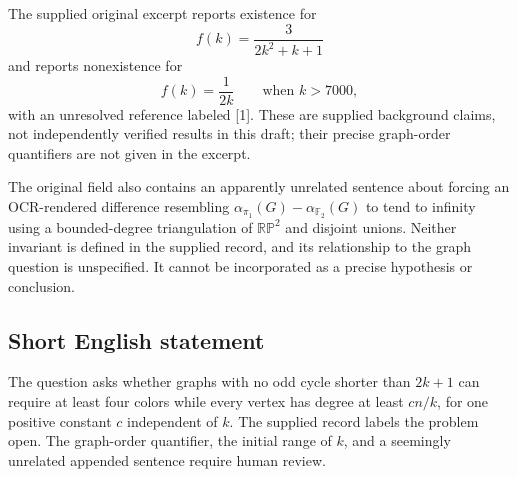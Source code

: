 \documentclass[11pt]{article}
\begin{document}
The supplied original excerpt reports existence for
\[
f(k)=\frac{3}{2k^2+k+1}
\]
and reports nonexistence for
\[
f(k)=\frac{1}{2k}\qquad\text{when }k>7000,
\]
with an unresolved reference labeled [1]. These are supplied background claims, not independently verified results in this draft; their precise graph-order quantifiers are not given in the excerpt.

The original field also contains an apparently unrelated sentence about forcing an OCR-rendered difference resembling \(\alpha_{\pi_1}(G)-\alpha_{\mathbb F_2}(G)\) to tend to infinity using a bounded-degree triangulation of \(\mathbb{RP}^{2}\) and disjoint unions. Neither invariant is defined in the supplied record, and its relationship to the graph question is unspecified. It cannot be incorporated as a precise hypothesis or conclusion.
\subsection{Short English statement}
The question asks whether graphs with no odd cycle shorter than \(2k+1\) can require at least four colors while every vertex has degree at least \(cn/k\), for one positive constant \(c\) independent of \(k\). The supplied record labels the problem open. The graph-order quantifier, the initial range of \(k\), and a seemingly unrelated appended sentence require human review.
\end{document}

